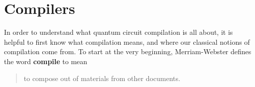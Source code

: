 
\section{Compilers}
In order to understand what quantum circuit compilation is all about, it is helpful to first know what compilation means, and where our classical notions of compilation come from.
To start at the very beginning, Merriam-Webster defines the word \textbf{compile} to mean~\cite{compiledef}
\begin{quote}
    to compose out of materials from other documents.
\end{quote}
